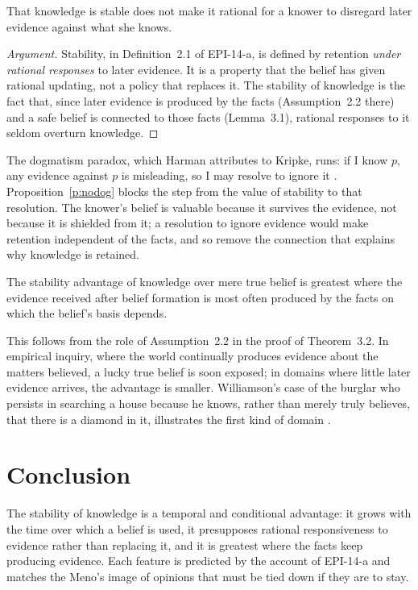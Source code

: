 \documentclass{situationist-preprint}
\begin{document}
\begin{proposition}[No dogmatism]\label{p:nodog}
That knowledge is stable does not make it rational for a knower to disregard later evidence against what she knows.
\end{proposition}

\begin{proof}[Argument]
Stability, in Definition~2.1 of EPI-14-a, is defined by retention \emph{under rational responses} to later evidence. It is a property that the belief has given rational updating, not a policy that replaces it. The stability of knowledge is the fact that, since later evidence is produced by the facts (Assumption~2.2 there) and a safe belief is connected to those facts (Lemma~3.1), rational responses to it seldom overturn knowledge.
\end{proof}

The dogmatism paradox, which Harman attributes to Kripke, runs: if I know $p$, any evidence against $p$ is misleading, so I may resolve to ignore it \citep{Harman1973}. Proposition~\ref{p:nodog} blocks the step from the value of stability to that resolution. The knower's belief is valuable because it survives the evidence, not because it is shielded from it; a resolution to ignore evidence would make retention independent of the facts, and so remove the connection that explains why knowledge is retained.

\begin{proposition}[Domain]\label{p:domain}
The stability advantage of knowledge over mere true belief is greatest where the evidence received after belief formation is most often produced by the facts on which the belief's basis depends.
\end{proposition}

This follows from the role of Assumption~2.2 in the proof of Theorem~3.2. In empirical inquiry, where the world continually produces evidence about the matters believed, a lucky true belief is soon exposed; in domains where little later evidence arrives, the advantage is smaller. Williamson's case of the burglar who persists in searching a house because he knows, rather than merely truly believes, that there is a diamond in it, illustrates the first kind of domain \citep[ch.~3]{Williamson2000}.

\section{Conclusion}

The stability of knowledge is a temporal and conditional advantage: it grows with the time over which a belief is used, it presupposes rational responsiveness to evidence rather than replacing it, and it is greatest where the facts keep producing evidence. Each feature is predicted by the account of EPI-14-a and matches the Meno's image of opinions that must be tied down if they are to stay.
\end{document}
